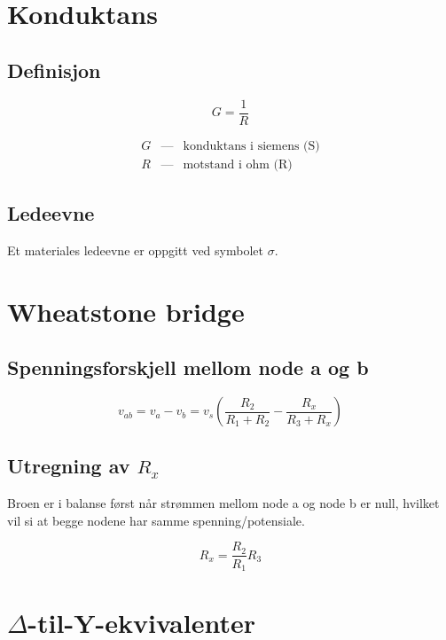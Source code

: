 \documentclass[norsk, a4paper, 12pt, twoside, titlepage]{article}
\begin{document}
\newpage
\section{Konduktans}
\subsection{Definisjon}
\begin{equation}
G = \frac{1}{R}
\end{equation}

\begin{eqnarray*}
G & \mbox{---} & \mbox{konduktans i siemens (S)} \\
R & \mbox{---} & \mbox{motstand i ohm (R)} 
\end{eqnarray*}

\subsection{Ledeevne}
Et materiales ledeevne er oppgitt ved symbolet $\sigma$.


\newpage
\section{Wheatstone bridge}
\subsection{Spenningsforskjell mellom node a og b}

\begin{equation}
v_{ab} = v_{a} - v_{b} = v_{s} \left(\frac{R_{2}}{R_{1} + R_{2}} -
\frac{R_{x}}{R_{3} + R_{x}}\right)
\end{equation}

\subsection{Utregning av $R_{x}$}
Broen er i balanse først når strømmen mellom node a og node b er null,
hvilket vil si at begge nodene har samme spenning/potensiale.

\begin{equation}
R_{x} = \frac{R_{2}}{R_{1}}R_{3}
\end{equation}


\newpage
{}
\section{$\Delta$-til-Y-ekvivalenter}
\end{document}
